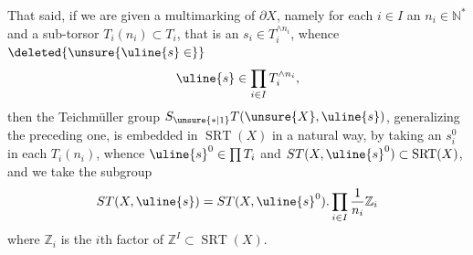 
That said, if we are given a
multimarking of $\partial X$, namely for
each $i\in I$ an $n_i\in\mathbb N^*$ and a
sub-torsor
$T_i(n_i)\subset T_i$,
 that is
an $s_i\in T_i^{\wedge n_i}$, whence
$\deleted{\unsure{\uline{s}\in}}$
\[
\uline{s}\in\prod_{i\in I}T_i^{\wedge n_i},
\]
then the  Teichmüller group
$S_{\unsure{*|1}}T(\unsure{X},\uline{s})$,
generalizing the preceding one, is
embedded in $\operatorname{SRT}(X)$ in a natural way,
by taking an $s_i^0$ in each $T_i(n_i)$, whence
$\uline{s}^0\in\prod T_i$ and
$ST(X,\uline{s}^0)\subset\operatorname{SRT}(X)$,
and we take the subgroup
\[
ST(X,\uline{s})=ST(X,\uline{s}^0).
\prod_{i\in I}\frac1{n_i}\mathbb Z_i
\]
where $\mathbb Z_i$ is the $i$th factor of
$\mathbb Z^I\subset\operatorname{SRT}(X)$.

